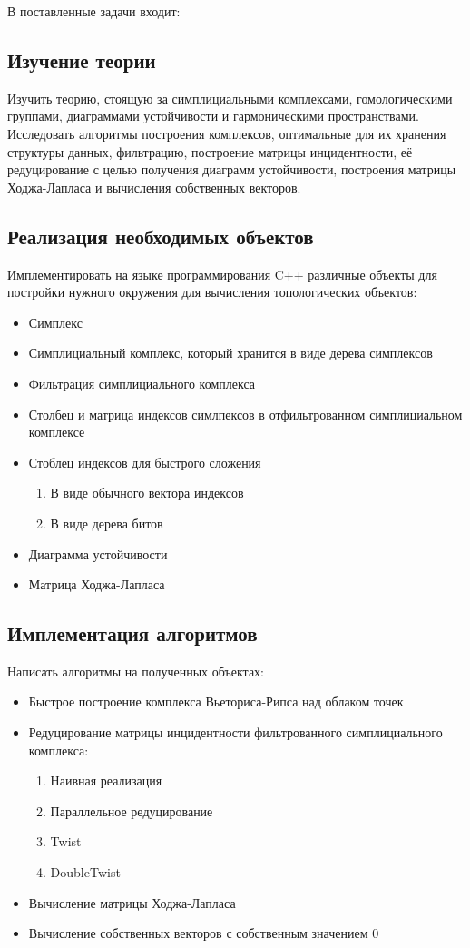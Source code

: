 \documentclass{article}
\begin{document}
В поставленные задачи входит:
\subsection*{Изучение теории}
Изучить теорию, стоящую за симплициальными комплексами, гомологическими группами, диаграммами устойчивости и гармоническими пространствами. Исследовать алгоритмы построения комплексов, оптимальные для их хранения структуры данных, фильтрацию, построение матрицы инцидентности, её редуцирование с целью получения диаграмм устойчивости, построения матрицы Ходжа-Лапласа и вычисления собственных векторов.
\subsection*{Реализация необходимых объектов}
Имплементировать на языке программирования C++ различные объекты для постройки нужного окружения для вычисления топологических объектов:
\begin{itemize}
  \item Симплекс
  \item Симплициальный комплекс, который хранится в виде дерева симплексов \cite{simplextree}
  \item Фильтрация симплициального комплекса
  \item Столбец и матрица индексов симлпексов в отфильтрованном симплициальном комплексе
  \item Стоблец индексов для быстрого сложения
    \begin{enumerate}
      \item В виде обычного вектора индексов
      \item В виде дерева битов \cite{bittreecolumn}
    \end{enumerate}
  \item Диаграмма устойчивости
  \item Матрица Ходжа-Лапласа \cite{laplacianmatrix}
\end{itemize}

\subsection*{Имплементация алгоритмов}
Написать алгоритмы на полученных объектах:
\begin{itemize}
  \item Быстрое построение комплекса Вьеториса-Рипса над облаком точек \cite{fastvr}
  \item Редуцирование матрицы инцидентности фильтрованного симплициального комплекса:
  \begin{enumerate}
    \item Наивная реализация
    \item Параллельное редуцирование \cite{parallelreduce}
    \item Twist \cite{twist}
    \item DoubleTwist \cite{doubletwist}
  \end{enumerate}
  \item Вычисление матрицы Ходжа-Лапласа
  \item Вычисление собственных векторов с собственным значением 0
\end{itemize}
\end{document}

